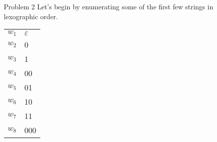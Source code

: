 \documentclass[12pt,letterpaper]{article}
\begin{document}
\begin{enumerate}
      \begin{proof} \
        Base Cases:
        \begin{enumerate}
          \item[$n = 1$]
            \[D_1 = 9 \cdot 10^{\lfloor \frac{1-1}{2} \rfloor} = 9 \cdot 10^0 = 9\]
          \item[$n = 2$]
            \[D_2 = 9 \cdot 10^{\lfloor \frac{2-1}{2} \rfloor} = 9 \cdot 10^0 = 9\]
        \end{enumerate}

        Inductive Hypothesis:
        \[D_n = 9 \cdot 10^{\lfloor \frac{n-1}{2} \rfloor}\]

        Inductive Case:
        \begin{align*}
          D_{n+1} &= D_{n-1} \cdot 10 \\
          &= 9 \cdot 10^{\lfloor \frac{(n-1)-1}{2} \rfloor} \cdot 10 \\
          &= 9 \cdot 10^{\lfloor \frac{n-2}{2} \rfloor} \cdot 10 \\
          &= 9 \cdot 10^{\lfloor \frac{n}{2}-\frac{2}{2} \rfloor} \cdot 10 \\
          &= 9 \cdot 10^{\lfloor \frac{n}{2}-1 \rfloor} \cdot 10 \\
          &= 9 \cdot 10^{\lfloor \frac{n}{2}-1+1 \rfloor} \\
          &= 9 \cdot 10^{\lfloor \frac{n}{2} \rfloor} \\
        \end{align*}

        Thus, we have proved that our formula is correct.

      \end{proof}

      Now, we can calculate
      $D_{20} = 9 \cdot 10^{\lfloor \frac{20-1}{2} \rfloor} = 9 \cdot 10^9 = 9000000000$

    \item[Problem 2]
      Let's begin by enumerating some of the first few strings in lexographic order.

      \begin{tabular}{l | l}
        \hline
        $w_1$ & $\varepsilon$ \\
        $w_2$ & 0 \\
        $w_3$ & 1 \\
        $w_4$ & 00 \\
        $w_5$ & 01 \\
        $w_6$ & 10 \\
        $w_7$ & 11 \\
        $w_8$ & 000
      \end{tabular}


\end{enumerate}
\end{document}
